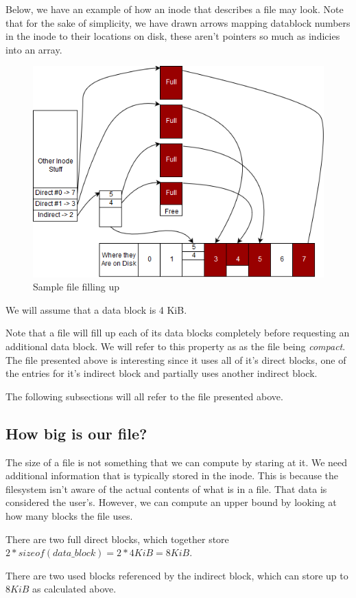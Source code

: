 Below, we have an example of how an inode that describes a file may look. Note that for the sake of simplicity, we have
drawn arrows mapping datablock numbers in the inode to their locations on disk, these aren't pointers so much as
indicies into an array.
\begin{figure}[htbp]
\centering
\includegraphics[width=.8\textwidth]{filesystems/images/sample_file.png}
\caption{Sample file filling up}
\end{figure}

We will assume that a data block is 4 KiB.

Note that a file will fill up each of its data blocks completely before requesting an additional data block. We will
refer to this property as as the file being \textit{compact}. The file presented above is interesting since it uses all
of it's direct blocks, one of the entries for it's indirect block and partially uses another indirect block.

The following subsections will all refer to the file presented above.

\subsection{How big is our file?}
The size of a file is not something that we can compute by staring at it. We need additional information that is
typically stored in the inode. This is because the filesystem isn't aware of the actual contents of what is in a file.
That data is considered the user's. However, we can compute an upper bound by looking at how many blocks the file uses.

There are two full direct blocks, which together store $2*sizeof(data\_block)=2*4KiB=8KiB$.

There are two used blocks referenced by the indirect block, which can store up to $8KiB$ as calculated above.

